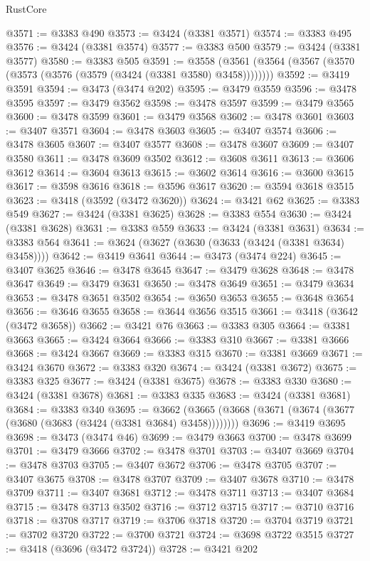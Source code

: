 \begin{lexlean}{RustCore}
\begin{coremodule}
@3571 := @3383 @490
@3573 := @3424 (@3381 @3571)
@3574 := @3383 @495
@3576 := @3424 (@3381 @3574)
@3577 := @3383 @500
@3579 := @3424 (@3381 @3577)
@3580 := @3383 @505
@3591 := @3558 (@3561 (@3564 (@3567 (@3570 (@3573 (@3576 (@3579 (@3424 (@3381 @3580) @3458))))))))
@3592 := @3419 @3591
@3594 := @3473 (@3474 @202)
@3595 := @3479 @3559
@3596 := @3478 @3595
@3597 := @3479 @3562
@3598 := @3478 @3597
@3599 := @3479 @3565
@3600 := @3478 @3599
@3601 := @3479 @3568
@3602 := @3478 @3601
@3603 := @3407 @3571
@3604 := @3478 @3603
@3605 := @3407 @3574
@3606 := @3478 @3605
@3607 := @3407 @3577
@3608 := @3478 @3607
@3609 := @3407 @3580
@3611 := @3478 @3609 @3502
@3612 := @3608 @3611
@3613 := @3606 @3612
@3614 := @3604 @3613
@3615 := @3602 @3614
@3616 := @3600 @3615
@3617 := @3598 @3616
@3618 := @3596 @3617
@3620 := @3594 @3618 @3515
@3623 := @3418 (@3592 (@3472 @3620))
@3624 := @3421 @62
@3625 := @3383 @549
@3627 := @3424 (@3381 @3625)
@3628 := @3383 @554
@3630 := @3424 (@3381 @3628)
@3631 := @3383 @559
@3633 := @3424 (@3381 @3631)
@3634 := @3383 @564
@3641 := @3624 (@3627 (@3630 (@3633 (@3424 (@3381 @3634) @3458))))
@3642 := @3419 @3641
@3644 := @3473 (@3474 @224)
@3645 := @3407 @3625
@3646 := @3478 @3645
@3647 := @3479 @3628
@3648 := @3478 @3647
@3649 := @3479 @3631
@3650 := @3478 @3649
@3651 := @3479 @3634
@3653 := @3478 @3651 @3502
@3654 := @3650 @3653
@3655 := @3648 @3654
@3656 := @3646 @3655
@3658 := @3644 @3656 @3515
@3661 := @3418 (@3642 (@3472 @3658))
@3662 := @3421 @76
@3663 := @3383 @305
@3664 := @3381 @3663
@3665 := @3424 @3664
@3666 := @3383 @310
@3667 := @3381 @3666
@3668 := @3424 @3667
@3669 := @3383 @315
@3670 := @3381 @3669
@3671 := @3424 @3670
@3672 := @3383 @320
@3674 := @3424 (@3381 @3672)
@3675 := @3383 @325
@3677 := @3424 (@3381 @3675)
@3678 := @3383 @330
@3680 := @3424 (@3381 @3678)
@3681 := @3383 @335
@3683 := @3424 (@3381 @3681)
@3684 := @3383 @340
@3695 := @3662 (@3665 (@3668 (@3671 (@3674 (@3677 (@3680 (@3683 (@3424 (@3381 @3684) @3458))))))))
@3696 := @3419 @3695
@3698 := @3473 (@3474 @46)
@3699 := @3479 @3663
@3700 := @3478 @3699
@3701 := @3479 @3666
@3702 := @3478 @3701
@3703 := @3407 @3669
@3704 := @3478 @3703
@3705 := @3407 @3672
@3706 := @3478 @3705
@3707 := @3407 @3675
@3708 := @3478 @3707
@3709 := @3407 @3678
@3710 := @3478 @3709
@3711 := @3407 @3681
@3712 := @3478 @3711
@3713 := @3407 @3684
@3715 := @3478 @3713 @3502
@3716 := @3712 @3715
@3717 := @3710 @3716
@3718 := @3708 @3717
@3719 := @3706 @3718
@3720 := @3704 @3719
@3721 := @3702 @3720
@3722 := @3700 @3721
@3724 := @3698 @3722 @3515
@3727 := @3418 (@3696 (@3472 @3724))
@3728 := @3421 @202

\end{coremodule}
\end{lexlean}
